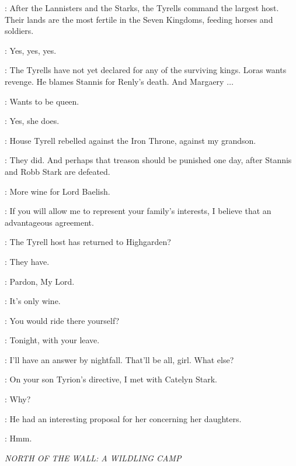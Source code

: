 \LITTLEFINGER: After the Lannisters and the Starks, the Tyrells command the largest host. Their lands are the most fertile in the Seven Kingdoms, feeding horses and soldiers. 

\TYWIN: Yes, yes, yes. 

\LITTLEFINGER: The Tyrells have not yet declared for any of the surviving kings. Loras wants revenge. He blames Stannis for Renly's death. And Margaery $\ldots$ 

\TYWIN: Wants to be queen. 

\LITTLEFINGER: Yes, she does. 

\TYWIN: House Tyrell rebelled against the Iron Throne, against my grandson. 

\LITTLEFINGER: They did. And perhaps that treason should be punished one day, after Stannis and Robb Stark are defeated. 

\TYWIN:  More wine for Lord Baelish. 


\LITTLEFINGER: If you will allow me to represent your family's interests, I believe that an advantageous agreement. 

\TYWIN: The Tyrell host has returned to Highgarden? 

\LITTLEFINGER: They have.


\ARYA: Pardon, My Lord. 

\LITTLEFINGER: It's only wine. 

\TYWIN: You would ride there yourself? 

\LITTLEFINGER: Tonight, with your leave. 

\TYWIN: I'll have an answer by nightfall. That'll be all, girl. What else? 

\LITTLEFINGER: On your son Tyrion's directive, I met with Catelyn Stark. 

\TYWIN: Why? 

\LITTLEFINGER: He had an interesting proposal for her concerning her daughters. 

\TYWIN: Hmm. 


\scene

\textit{NORTH OF THE WALL: A WILDLING CAMP} 


